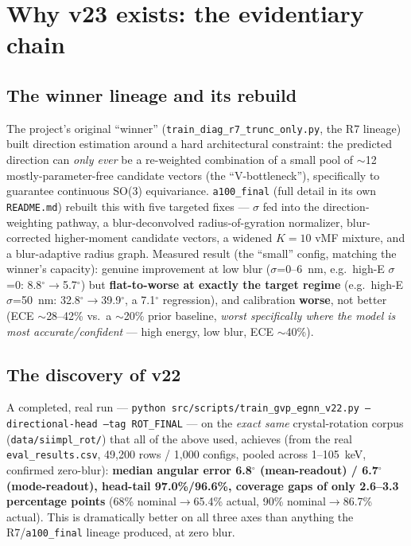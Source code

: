 \documentclass[11pt]{article}
\newcommand{\code}[1]{\texttt{#1}}
\begin{document}
\section{Why v23 exists: the evidentiary chain}

\subsection{The winner lineage and its rebuild}
The project's original ``winner'' (\code{train\_diag\_r7\_trunc\_only.py}, the R7 lineage)
built direction estimation around a hard architectural constraint: the predicted direction
can \emph{only ever} be a re-weighted combination of a small pool of $\sim$12
mostly-parameter-free candidate vectors (the ``V-bottleneck''), specifically to guarantee
continuous SO(3) equivariance. \code{a100\_final} (full detail in its own
\code{README.md}) rebuilt this with five targeted fixes --- $\sigma$ fed into the
direction-weighting pathway, a blur-deconvolved radius-of-gyration normalizer, blur-corrected
higher-moment candidate vectors, a widened $K{=}10$ vMF mixture, and a blur-adaptive radius
graph. Measured result (the ``small'' config, matching the winner's capacity): genuine
improvement at low blur ($\sigma$=0--6~nm, e.g.\ high-E $\sigma$=0: 8.8$^\circ\to$5.7$^\circ$)
but \textbf{flat-to-worse at exactly the target regime} (e.g.\ high-E $\sigma$=50~nm:
32.8$^\circ\to$39.9$^\circ$, a 7.1$^\circ$ regression), and calibration \textbf{worse}, not
better (ECE $\sim$28--42\% vs.\ a $\sim$20\% prior baseline, \emph{worst specifically where
the model is most accurate/confident} --- high energy, low blur, ECE $\sim$40\%).

\subsection{The discovery of v22}
A completed, real run --- \code{python src/scripts/train\_gvp\_egnn\_v22.py
--directional-head --tag ROT\_FINAL} --- on the \emph{exact same} crystal-rotation corpus
(\code{data/siimpl\_rot/}) that all of the above used, achieves (from the real
\code{eval\_results.csv}, 49{,}200 rows / 1{,}000 configs, pooled across 1--105~keV, confirmed
zero-blur): \textbf{median angular error 6.8$^\circ$ (mean-readout) / 6.7$^\circ$
(mode-readout), head-tail 97.0\%/96.6\%, coverage gaps of only 2.6--3.3 percentage points}
(68\% nominal$\to$65.4\% actual, 90\% nominal$\to$86.7\% actual). This is dramatically better
on all three axes than anything the R7/\code{a100\_final} lineage produced, at zero blur.
\end{document}
